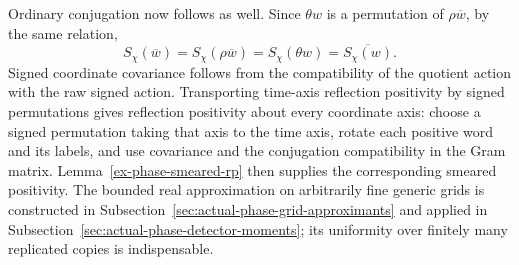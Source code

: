 Ordinary conjugation now follows as well. Since \(\theta w\) is a
permutation of \(\rho\overline w\), by the same relation,
\[
 S_\chi(\overline w)=S_\chi(\rho\overline w)
 =S_\chi(\theta w)=\overline{S_\chi(w)}.
\]
Signed coordinate covariance follows from the compatibility of the
quotient action with the raw signed action. Transporting time-axis
reflection positivity by signed permutations gives reflection positivity
about every coordinate axis: choose a signed permutation taking that
axis to the time axis, rotate each positive word and its labels, and use
covariance and the conjugation compatibility in the Gram matrix.
Lemma~\ref{ex-phase-smeared-rp} then supplies the corresponding smeared
positivity. The bounded real approximation on arbitrarily fine generic grids is
constructed in Subsection~\ref{sec:actual-phase-grid-approximants} and
applied in Subsection~\ref{sec:actual-phase-detector-moments};
its uniformity over finitely many replicated copies is indispensable.
